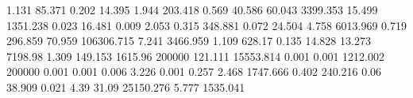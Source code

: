 1.131      85.371     %
0.202      14.395     %
1.944      203.418    %
0.569      40.586     %
60.043     3399.353   %
15.499     1351.238   %
0.023      16.481     %
0.009      2.053      %
0.315      348.881    %
0.072      24.504     %
4.758      6013.969   %
0.719      296.859    %
70.959     106306.715 %
7.241      3466.959   %
1.109      628.17     %
0.135      14.828     %
13.273     7198.98    %
1.309      149.153    %
1615.96    200000     %
121.111    15553.814  %
0.001      0.001      %
1212.002   200000     %
0.001      0.001      %
0.006      3.226      %
0.001      0.257      %
2.468      1747.666   %
0.402      240.216    %
0.06       38.909     %
0.021      4.39       %
31.09      25150.276  %
5.777      1535.041   %
